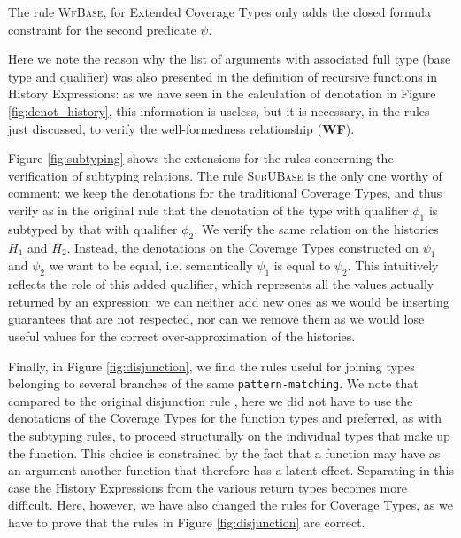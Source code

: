 The rule \textsc{WfBase}, for Extended Coverage Types only adds the closed formula constraint for the second predicate $\psi$.

Here we note the reason why the list of arguments with associated full type (base type and qualifier) was also presented in the definition of recursive functions in History Expressions: as we have seen in the calculation of denotation in Figure \ref{fig:denot_history}, this information is useless, but it is necessary, in the rules just discussed, to verify the well-formedness relationship (\textbf{WF}).

Figure \ref{fig:subtyping} shows the extensions for the rules concerning the verification of subtyping relations. The rule \textsc{SubUBase} is the only one worthy of comment: we keep the denotations for the traditional Coverage Types, and thus verify as in the original rule that the denotation of the type with qualifier $\phi_1$ is subtyped by that with qualifier $\phi_2$. We verify the same relation on the histories $H_1$ and $H_2$. Instead, the denotations on the Coverage Types constructed on $\psi_1$ and $\psi_2$ we want to be equal, i.e. semantically $\psi_1$ is equal to $\psi_2$. This intuitively reflects the role of this added qualifier, which represents all the values actually returned by an expression: we can neither add new ones as we would be inserting guarantees that are not respected, nor can we remove them as we would lose useful values for the correct over-approximation of the histories.

Finally, in Figure \ref{fig:disjunction}, we find the rules useful for joining types belonging to several branches of the same \verb|pattern-matching|. We note that compared to the original disjunction rule \cite{coverage}, here we did not have to use the denotations of the Coverage Types for the function types and preferred, as with the subtyping rules, to proceed structurally on the individual types that make up the function. This choice is constrained by the fact that a function may have as an argument another function that therefore has a latent effect. Separating in this case the History Expressions from the various return types becomes more difficult. Here, however, we have also changed the rules for Coverage Types, as we have to prove that the rules in Figure \ref{fig:disjunction} are correct.

